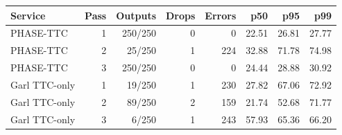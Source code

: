 \begin{tabular}{lrrrrrrr}
\toprule
Service & Pass & Outputs & Drops & Errors & p50 & p95 & p99 \\
\midrule
PHASE-TTC & 1 & 250/250 & 0 & 0 & 22.51 & 26.81 & 27.77 \\
PHASE-TTC & 2 & 25/250 & 1 & 224 & 32.88 & 71.78 & 74.98 \\
PHASE-TTC & 3 & 250/250 & 0 & 0 & 24.44 & 28.88 & 30.92 \\
Garl TTC-only & 1 & 19/250 & 1 & 230 & 27.82 & 67.06 & 72.92 \\
Garl TTC-only & 2 & 89/250 & 2 & 159 & 21.74 & 52.68 & 71.77 \\
Garl TTC-only & 3 & 6/250 & 1 & 243 & 57.93 & 65.36 & 66.20 \\
\bottomrule
\end{tabular}
